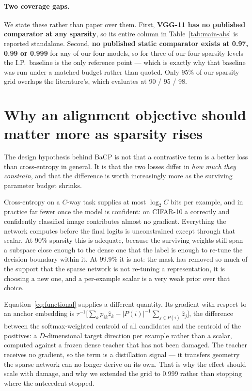 \paragraph{Two coverage gaps.}
We state these rather than paper over them. First, \textbf{VGG-11 has no
published comparator at any sparsity}, so its entire column in
Table~\ref{tab:main-abs} is reported standalone. Second, \textbf{no published
static comparator exists at 0.97, 0.99 or 0.999} for any of our four models, so
for three of our four sparsity levels the I.P.\ baseline is the only reference
point --- which is exactly why that baseline was run under a matched budget
rather than quoted. Only 95\% of our sparsity grid overlaps the literature's,
which evaluates at 90 / 95 / 98.

\section{Why an alignment objective should matter more as sparsity rises}
\label{sec:app:mechanism}

The design hypothesis behind BaCP is not that a contrastive term is a better loss
than cross-entropy in general. It is that the two losses differ in \emph{how much
they constrain}, and that the difference is worth increasingly more as the
surviving parameter budget shrinks.

Cross-entropy on a $C$-way task supplies at most $\log_2 C$ bits per example, and
in practice far fewer once the model is confident: on CIFAR-10 a correctly and
confidently classified image contributes almost no gradient. Everything the
network computes before the final logits is unconstrained except through that
scalar. At 90\% sparsity this is adequate, because the surviving weights still
span a subspace close enough to the dense one that the label is enough to
re-tune the decision boundary within it. At 99.9\% it is not: the mask has
removed so much of the support that the sparse network is not re-tuning a
representation, it is choosing a new one, and a per-example scalar is a very weak
prior over that choice.

Equation~\eqref{eq:functional} supplies a different quantity. Its gradient with
respect to an anchor embedding is
$\tau^{-1}\big[\sum_k p_{ik}\hat z_k - |P(i)|^{-1}\sum_{j\in P(i)} \hat z_j\big]$,
the difference between the softmax-weighted centroid of all candidates and the
centroid of the positives: a $D$-dimensional target direction per example rather
than a scalar, computed against a frozen dense teacher that has not been damaged.
The teacher receives no gradient, so the term is a distillation signal --- it
transfers geometry the sparse network can no longer derive on its own. That is
why the effect should scale with damage, and why we extended the grid to 0.999
rather than stopping where the antecedent stopped.

